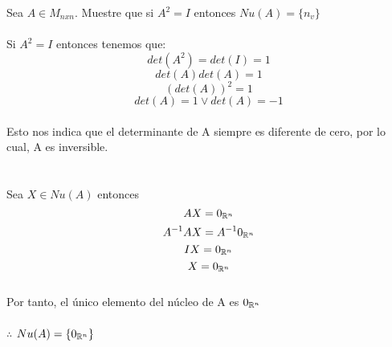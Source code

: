 \begin{ejercicio}

Sea $A \in M_{nxn} $. Muestre que si $A^2=I$ entonces $Nu(A)=\{n_v\}$
~\\
\sol
~\\
Si $A^2=I$  entonces tenemos que:~\\
\[det(A^2)=det(I)=1\]
\[det(A)det(A)=1\]
\[(det(A))^2=1\]
\[det(A)=1 \vee det(A)=-1\]
~\\
Esto nos indica que el determinante de A siempre es diferente de cero, por lo cual, A es inversible.~\\
~\\
~\\
Sea $X\in Nu(A)$ entonces 
\[AX=0_{\mathbb{R}^n}\]
\[A^{-1}AX=A^{-1} 0_{\mathbb{R}^n}\]
\[IX=0_{\mathbb{R}^n}\]
\[X=0_{\mathbb{R}^n}\]
~\\
Por tanto, el único elemento del núcleo de A es $0_{\mathbb{R}^n}$
~\\
~\\
$\therefore$ $Nu(A)=\lbrace 0_{\mathbb{R}^n} \rbrace$

\end{ejercicio}

